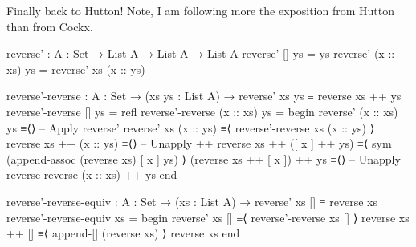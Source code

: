 \documentclass{article}
\begin{document}
\noindent
Finally back to Hutton! Note, I am following more the exposition from Hutton than from Cockx.

\begin{code}
reverse' : {A : Set} → List A → List A → List A
reverse' [] ys = ys
reverse' (x :: xs) ys = reverse' xs (x :: ys)
\end{code}

\begin{code}
reverse'-reverse : {A : Set} → (xs ys : List A)
    → reverse' xs ys ≡ reverse xs ++ ys
reverse'-reverse [] ys = refl
reverse'-reverse (x :: xs) ys =
  begin
    reverse' (x :: xs) ys
  ≡⟨⟩ -- Apply reverse'
    reverse' xs (x :: ys)
  ≡⟨ reverse'-reverse xs (x :: ys) ⟩
    reverse xs ++ (x :: ys)
  ≡⟨⟩ -- Unapply ++
    reverse xs ++ ([ x ] ++ ys)
  ≡⟨ sym (append-assoc (reverse xs) [ x ] ys) ⟩
    (reverse xs ++ [ x ]) ++ ys
  ≡⟨⟩ -- Unapply reverse
    reverse (x :: xs) ++ ys
  end
\end{code}

\begin{code}
reverse'-reverse-equiv : {A : Set} → (xs : List A)
    → reverse' xs [] ≡ reverse xs
reverse'-reverse-equiv xs =
  begin
    reverse' xs []
  ≡⟨ reverse'-reverse xs [] ⟩
    reverse xs ++ []
  ≡⟨ append-[] (reverse xs) ⟩
    reverse xs
  end
\end{code}
\end{document}
